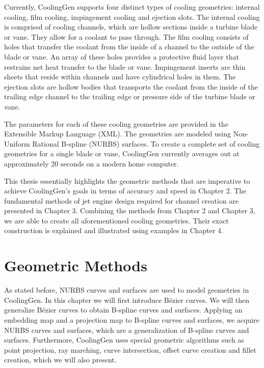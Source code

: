 \documentclass[a4paper, 11pt]{report}
\theoremstyle{definition}
\begin{document}
		Currently, CoolingGen supports four distinct types of cooling geometries: internal cooling, film cooling, impingement cooling and ejection slots. The internal cooling is comprised of cooling channels, which are hollow sections inside a turbine blade or vane. They allow for a coolant to pass through. The film cooling consists of holes that transfer the coolant from the inside of a channel to the outside of the blade or vane. An array of these holes provides a protective fluid layer that restrains net heat transfer to the blade or vane. Impingement inserts are thin sheets that reside within channels and have cylindrical holes in them. The ejection slots are hollow bodies that transports the coolant from the inside of the trailing edge channel to the trailing edge or pressure side of the turbine blade or vane.

		The parameters for each of these cooling geometries are provided in the Extensible Markup Language (XML). The geometries are modeled using Non-Uniform Rational B-spline (NURBS) surfaces. To create a complete set of cooling geometries for a single blade or vane, CoolingGen currently averages out at approximately 20 seconds on a modern home computer.
		
		This thesis essentially highlights the geometric methods that are imperative to achieve CoolingGen's goals in terms of accuracy and speed in Chapter 2. The fundamental methods of jet engine design required for channel creation are presented in Chapter 3. Combining the methods from Chapter 2 and Chapter 3, we are able to create all aforementioned cooling geometries. Their exact construction is explained and illustrated using examples in Chapter 4.

\chapter{Geometric Methods}\label{chap:methods}
	As stated before, NURBS curves and surfaces are used to model geometries in CoolingGen. In this chapter we will first introduce Bézier curves. We will then generalize Bézier curves to obtain B-spline curves and surfaces. Applying an embedding map and a projection map to B-spline curves and surfaces, we acquire NURBS curves and surfaces, which are a generalization of B-spline curves and surfaces. Furthermore, CoolingGen uses special geometric algorithms such as point projection, ray marching, curve intersection, offset curve creation and fillet creation, which we will also present.
\end{document}
